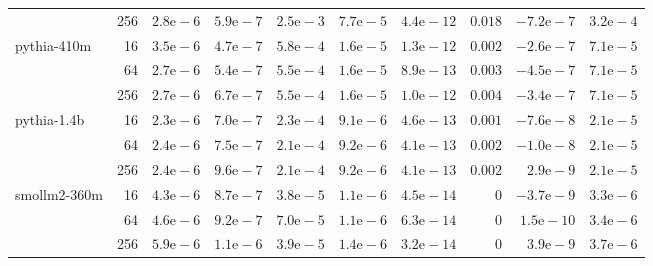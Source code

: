 \begin{tabular}{lr ccccc r rr}
 & 256 & $2.8\text{e}-6$ & $5.9\text{e}-7$ & $2.5\text{e}-3$ & $7.7\text{e}-5$ & $4.4\text{e}-12$ & $0.018$ & $-7.2\text{e}-7$ & $3.2\text{e}-4$ \\
pythia-410m & 16 & $3.5\text{e}-6$ & $4.7\text{e}-7$ & $5.8\text{e}-4$ & $1.6\text{e}-5$ & $1.3\text{e}-12$ & $0.002$ & $-2.6\text{e}-7$ & $7.1\text{e}-5$ \\
 & 64 & $2.7\text{e}-6$ & $5.4\text{e}-7$ & $5.5\text{e}-4$ & $1.6\text{e}-5$ & $8.9\text{e}-13$ & $0.003$ & $-4.5\text{e}-7$ & $7.1\text{e}-5$ \\
 & 256 & $2.7\text{e}-6$ & $6.7\text{e}-7$ & $5.5\text{e}-4$ & $1.6\text{e}-5$ & $1.0\text{e}-12$ & $0.004$ & $-3.4\text{e}-7$ & $7.1\text{e}-5$ \\
pythia-1.4b & 16 & $2.3\text{e}-6$ & $7.0\text{e}-7$ & $2.3\text{e}-4$ & $9.1\text{e}-6$ & $4.6\text{e}-13$ & $0.001$ & $-7.6\text{e}-8$ & $2.1\text{e}-5$ \\
 & 64 & $2.4\text{e}-6$ & $7.5\text{e}-7$ & $2.1\text{e}-4$ & $9.2\text{e}-6$ & $4.1\text{e}-13$ & $0.002$ & $-1.0\text{e}-8$ & $2.1\text{e}-5$ \\
 & 256 & $2.4\text{e}-6$ & $9.6\text{e}-7$ & $2.1\text{e}-4$ & $9.2\text{e}-6$ & $4.1\text{e}-13$ & $0.002$ & $2.9\text{e}-9$ & $2.1\text{e}-5$ \\
smollm2-360m & 16 & $4.3\text{e}-6$ & $8.7\text{e}-7$ & $3.8\text{e}-5$ & $1.1\text{e}-6$ & $4.5\text{e}-14$ & $0$ & $-3.7\text{e}-9$ & $3.3\text{e}-6$ \\
 & 64 & $4.6\text{e}-6$ & $9.2\text{e}-7$ & $7.0\text{e}-5$ & $1.1\text{e}-6$ & $6.3\text{e}-14$ & $0$ & $1.5\text{e}-10$ & $3.4\text{e}-6$ \\
 & 256 & $5.9\text{e}-6$ & $1.1\text{e}-6$ & $3.9\text{e}-5$ & $1.4\text{e}-6$ & $3.2\text{e}-14$ & $0$ & $3.9\text{e}-9$ & $3.7\text{e}-6$ \\
\bottomrule
\end{tabular}
